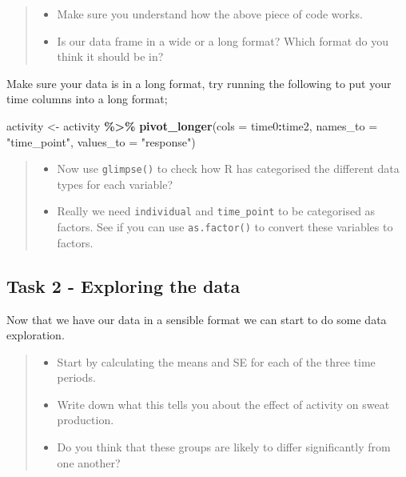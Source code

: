 \documentclass[
]{book}
\newenvironment{Shaded}{\begin{snugshade}}{\end{snugshade}}
\newcommand{\AttributeTok}[1]{\textcolor[rgb]{0.13,0.29,0.53}{#1}}
\newcommand{\FunctionTok}[1]{\textcolor[rgb]{0.13,0.29,0.53}{\textbf{#1}}}
\newcommand{\NormalTok}[1]{#1}
\newcommand{\OtherTok}[1]{\textcolor[rgb]{0.56,0.35,0.01}{#1}}
\newcommand{\SpecialCharTok}[1]{\textcolor[rgb]{0.81,0.36,0.00}{\textbf{#1}}}
\newcommand{\StringTok}[1]{\textcolor[rgb]{0.31,0.60,0.02}{#1}}
\providecommand{\tightlist}{%
  \setlength{\itemsep}{0pt}\setlength{\parskip}{0pt}}
\begin{document}
\begin{quote}
\begin{itemize}
\tightlist
\item
  Make sure you understand how the above piece of code works.
\item
  Is our data frame in a wide or a long format? Which format do you think it should be in?
\end{itemize}
\end{quote}

Make sure your data is in a long format, try running the following to put your time columns into a long format;

\begin{Shaded}
\begin{Highlighting}[]
\NormalTok{activity }\OtherTok{\textless{}{-}}\NormalTok{ activity }\SpecialCharTok{\%\textgreater{}\%}
  \FunctionTok{pivot\_longer}\NormalTok{(}\AttributeTok{cols =}\NormalTok{ time0}\SpecialCharTok{:}\NormalTok{time2,}
               \AttributeTok{names\_to =} \StringTok{"time\_point"}\NormalTok{, }
               \AttributeTok{values\_to =} \StringTok{"response"}\NormalTok{)}
\end{Highlighting}
\end{Shaded}

\begin{quote}
\begin{itemize}
\tightlist
\item
  Now use \texttt{glimpse()} to check how R has categorised the different data types for each variable?
\item
  Really we need \texttt{individual} and \texttt{time\_point} to be categorised as factors. See if you can use \texttt{as.factor()} to convert these variables to factors.
\end{itemize}
\end{quote}

\hypertarget{task-2---exploring-the-data-2}{%
\subsection{Task 2 - Exploring the data}\label{task-2---exploring-the-data-2}}

Now that we have our data in a sensible format we can start to do some data exploration.

\begin{quote}
\begin{itemize}
\tightlist
\item
  Start by calculating the means and SE for each of the three time periods.
\item
  Write down what this tells you about the effect of activity on sweat production.
\item
  Do you think that these groups are likely to differ significantly from one another?
\end{itemize}
\end{quote}
\end{document}
